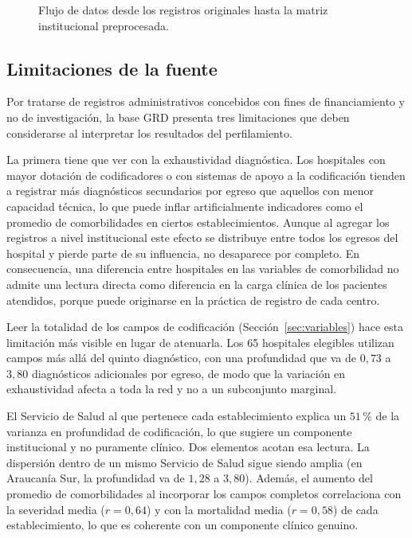 \begin{figure}[H]
\caption{Flujo de datos desde los registros originales hasta la matriz institucional preprocesada.}
\label{fig:pipeline-datos}
\end{figure}

\subsection{Limitaciones de la fuente}
\label{sec:limitaciones-fuente}

Por tratarse de registros administrativos concebidos con fines de financiamiento
y no de investigación, la base GRD presenta tres limitaciones que deben
considerarse al interpretar los resultados del perfilamiento.

La primera tiene que ver con la exhaustividad diagnóstica. Los hospitales con
mayor dotación de codificadores o con sistemas de apoyo a la codificación tienden
a registrar más diagnósticos secundarios por egreso que aquellos con menor
capacidad técnica, lo que puede inflar artificialmente indicadores como el
promedio de comorbilidades en ciertos establecimientos. Aunque al agregar los
registros a nivel institucional este efecto se distribuye entre todos los egresos
del hospital y pierde parte de su influencia, no desaparece por completo. En
consecuencia, una diferencia entre hospitales en las variables de comorbilidad no
admite una lectura directa como diferencia en la carga clínica de los pacientes
atendidos, porque puede originarse en la práctica de registro de cada centro.

Leer la totalidad de los campos de codificación (Sección~\ref{sec:variables})
hace esta limitación más visible en lugar de atenuarla. Los 65 hospitales
elegibles utilizan campos más allá del quinto diagnóstico, con una profundidad
que va de $0{,}73$ a $3{,}80$ diagnósticos adicionales por egreso, de modo que
la variación en exhaustividad afecta a toda la red y no a un subconjunto
marginal.

El Servicio de Salud al que pertenece cada establecimiento explica un
$51\,\%$ de la varianza en profundidad de codificación, lo que sugiere un
componente institucional y no puramente clínico. Dos elementos acotan esa
lectura. La dispersión dentro de un mismo Servicio de Salud sigue siendo amplia
(en Araucanía Sur, la profundidad va de $1{,}28$ a $3{,}80$). Además, el
aumento del promedio de comorbilidades al incorporar los campos completos
correlaciona con la severidad media ($r = 0{,}64$) y con la mortalidad media
($r = 0{,}58$) de cada establecimiento, lo que es coherente con un componente
clínico genuino.

